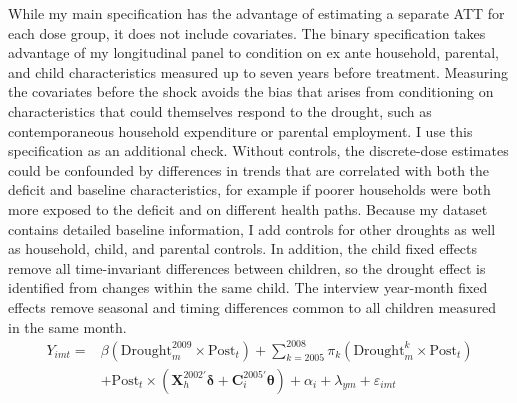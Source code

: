 While my main specification has the advantage of estimating a separate ATT for each dose group, it does not include covariates. The binary specification takes advantage of my longitudinal panel to condition on ex ante household, parental, and child characteristics measured up to seven years before treatment. Measuring the covariates before the shock avoids the bias that arises from conditioning on characteristics that could themselves respond to the drought, such as contemporaneous household expenditure or parental employment. I use this specification as an additional check. Without controls, the discrete-dose estimates could be confounded by differences in trends that are correlated with both the deficit and baseline characteristics, for example if poorer households were both more exposed to the deficit and on different health paths. Because my dataset contains detailed baseline information, I add controls for other droughts as well as household, child, and parental controls. In addition, the child fixed effects remove all time-invariant differences between children, so the drought effect is identified from changes within the same child. The interview year-month fixed effects remove seasonal and timing differences common to all children measured in the same month.
\begin{equation}
\begin{split}
Y_{imt} = {} & \beta\left(\text{Drought}_m^{2009} \times \text{Post}_t\right) + \sum_{k=2005}^{2008} \pi_k \left(\text{Drought}_m^{k} \times \text{Post}_t\right) \\
& + \text{Post}_t \times \left(\mathbf{X}_h^{2002\prime}\boldsymbol{\delta} + \mathbf{C}_i^{2005\prime}\boldsymbol{\theta}\right) + \alpha_i + \lambda_{ym} + \varepsilon_{imt}
\end{split}
\label{eq:binary}
\end{equation}

